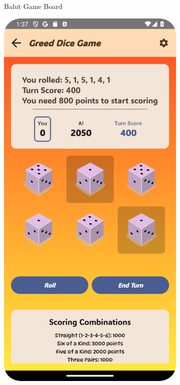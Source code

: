 \begin{figure}[ht!]
\begin{subfigure}[b]{0.27\textwidth}
        \caption{Balut Game Board}
    \end{subfigure}
    \hfill
    \begin{subfigure}[b]{0.27\textwidth}
        \includegraphics[width=\textwidth]{img/greed board.png}

\end{subfigure}
\end{figure}
